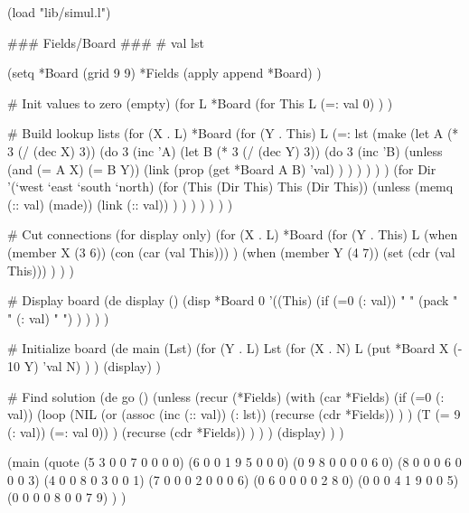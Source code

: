 \begin{itemize}
\begin{wideverbatim}
(load "lib/simul.l")

### Fields/Board ###
# val lst

(setq
   *Board (grid 9 9)
   *Fields (apply append *Board) )

# Init values to zero (empty)
(for L *Board
   (for This L
      (=: val 0) ) )

# Build lookup lists
(for (X . L) *Board
   (for (Y . This) L
      (=: lst
         (make
            (let A (* 3 (/ (dec X) 3))
               (do 3
                  (inc 'A)
                  (let B (* 3 (/ (dec Y) 3))
                     (do 3
                        (inc 'B)
                        (unless (and (= A X) (= B Y))
                           (link
                              (prop (get *Board A B) 'val) ) ) ) ) ) )
            (for Dir '(`west `east `south `north)
               (for (This (Dir This)  This  (Dir This))
                  (unless (memq (:: val) (made))
                     (link (:: val)) ) ) ) ) ) ) )

\end{wideverbatim}

\begin{wideverbatim}


# Cut connections (for display only)
(for (X . L) *Board
   (for (Y . This) L
      (when (member X (3 6))
         (con (car (val This))) )
      (when (member Y (4 7))
         (set (cdr (val This))) ) ) )

# Display board
(de display ()
   (disp *Board 0
      '((This)
         (if (=0 (: val))
            "   "
            (pack " " (: val) " ") ) ) ) )

# Initialize board
(de main (Lst)
   (for (Y . L) Lst
      (for (X . N) L
         (put *Board X (- 10 Y) 'val N) ) )
   (display) )

# Find solution
(de go ()
   (unless
      (recur (*Fields)
         (with (car *Fields)
            (if (=0 (: val))
               (loop
                  (NIL
                     (or
                        (assoc (inc (:: val)) (: lst))
                        (recurse (cdr *Fields)) ) )
                  (T (= 9 (: val)) (=: val 0)) )
               (recurse (cdr *Fields)) ) ) )
      (display) ) )

(main
   (quote
      (5 3 0 0 7 0 0 0 0)
      (6 0 0 1 9 5 0 0 0)
      (0 9 8 0 0 0 0 6 0)
      (8 0 0 0 6 0 0 0 3)
      (4 0 0 8 0 3 0 0 1)
      (7 0 0 0 2 0 0 0 6)
      (0 6 0 0 0 0 2 8 0)
      (0 0 0 4 1 9 0 0 5)
      (0 0 0 0 8 0 0 7 9) ) )


\end{wideverbatim}
\end{itemize}
